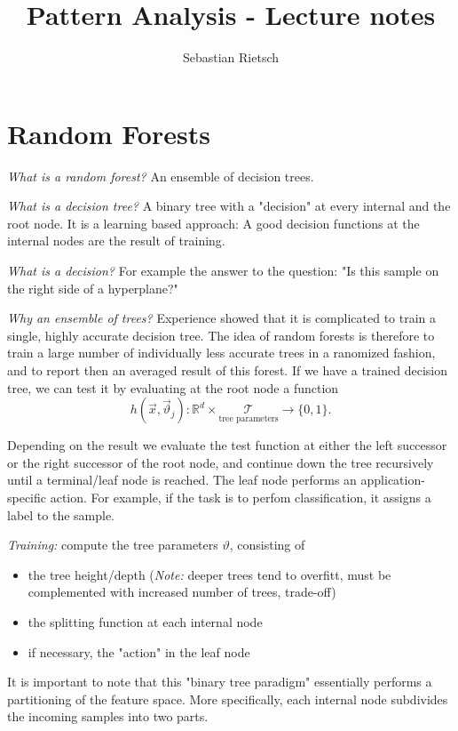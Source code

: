 \documentclass{scrartcl}
\title{Pattern Analysis - Lecture notes}
\author{Sebastian Rietsch}
\begin{document}
\maketitle
\section{Random Forests}
\textit{What is a random forest?} An ensemble of decision trees.

\textit{What is a decision tree?} A binary tree with a "decision" at every internal and the root node. It is a learning based approach: A good decision functions at the internal nodes are the result of training.

\textit{What is a decision?} For example the answer to the question: "Is this sample on the right side of a hyperplane?"

\textit{Why an ensemble of trees?} Experience showed that it is complicated to train a single, highly accurate decision tree. The idea of random forests is therefore to train a large number of individually less accurate trees in a ranomized fashion, and to report then an averaged result of this forest. 
If we have a trained decision tree, we can test it by evaluating at the root node a function
\[h(\vec{x}, \vec{\vartheta}_j): \mathbb{R}^d \times \underset{\text{tree parameters}}{\mathcal{T}} \rightarrow \{0, 1\}.\]

Depending on the result we evaluate the test function at either the left successor or the right successor of the root node, and continue down the tree recursively until a terminal/leaf node is reached.
The leaf node performs an application-specific action. For example, if the task is to perfom classification, it assigns a label to the sample.

\textit{Training:} compute the tree parameters \(\vartheta\), consisting of
\begin{itemize}
    \item
        the tree height/depth (\textit{Note:} deeper trees tend to overfitt, must be complemented with increased number of trees, trade-off)
    \item
        the splitting function at each internal node
    \item
        if necessary, the "action" in the leaf node
\end{itemize}

It is important to note that this "binary tree paradigm" essentially performs a partitioning of the feature space. More specifically, each internal node subdivides the incoming samples into two parts.
\end{document}
